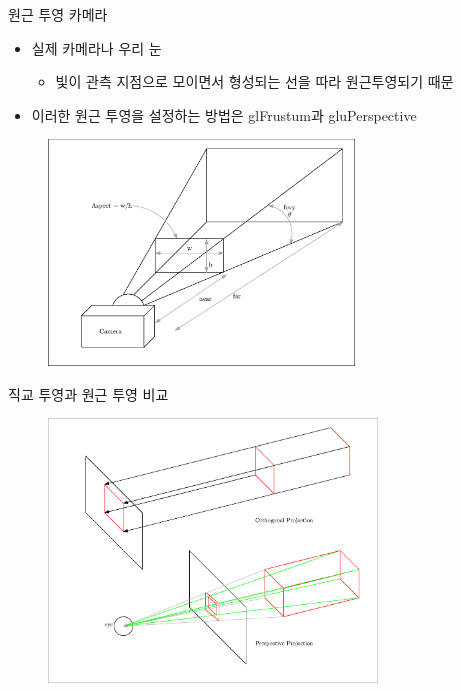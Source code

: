 \documentclass{beamer}
\begin{document}
\begin{frame}[fragile]{원근 투영 카메라}

\begin{itemize}
\item 실제 카메라나 우리 눈
	\begin{itemize}
	 있는 것은 작게 보이고 가까이 있는 것은 크게 보임
	\item 빛이 관측 지점으로 모이면서 형성되는 선을 따라 원근투영되기 때문
	\end{itemize}
\item 이러한 원근 투영을 설정하는 방법은 {\sf glFrustum}과 {\sf gluPerspective}
\end{itemize}

\begin{figure}[h!]
  \centering
    \includegraphics[height=6cm]{OGL_camera/perspectiveCam.eps}
\end{figure}

\end{frame}

\begin{frame}[fragile]{직교 투영과 원근 투영 비교}

\begin{figure}[h!]
  \centering
    \includegraphics[height=7cm]{OGL_camera/projection.eps}
\end{figure}

\end{frame}
\end{document}

